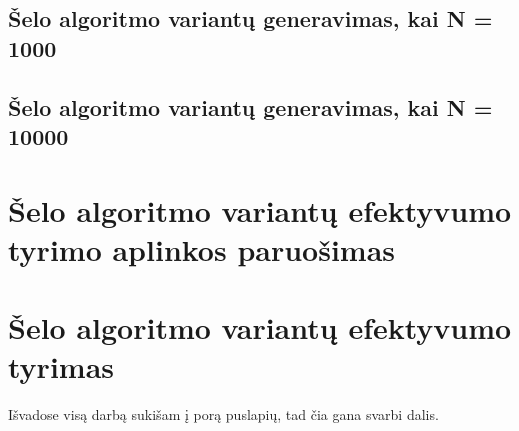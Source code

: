 \documentclass{VUMIFInfKursinis}
\begin{document}
\subsection{Šelo algoritmo variantų generavimas, kai N = 1000} %

\subsection{Šelo algoritmo variantų generavimas, kai N = 10000} %

\section{Šelo algoritmo variantų efektyvumo tyrimo aplinkos paruošimas}

\section{Šelo algoritmo variantų efektyvumo tyrimas}




Išvadose visą darbą sukišam į porą puslapių, tad čia gana svarbi dalis.

\printbibliography[heading=bibintoc] %

\end{document}
